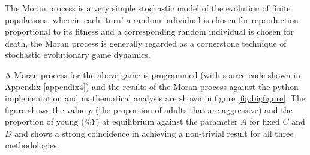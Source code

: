The Moran process is a very simple stochastic model of the evolution of finite populations, wherein each 'turn' a random individual is chosen for reproduction proportional to its fitness and a corresponding random individual is chosen for death, the Moran process is generally regarded as a cornerstone technique of stochastic evolutionary game dynamics.\cite{stochastic1}

A Moran process for the above game is programmed (with source-code shown in Appendix \ref{appendix4}) and the results of the Moran process against the python implementation and mathematical analysis are shown in figure \ref{fig:bigfigure}.
The figure shows the value $p$ (the proportion of adults that are aggressive) and the proportion of young ($\%Y$) at equilibrium against the parameter $A$ for fixed $C$ and $D$ and shows a strong coincidence in achieving a non-trivial result for all three methodologies.

